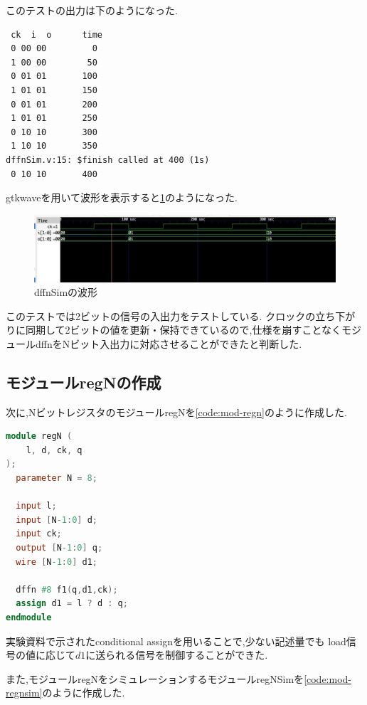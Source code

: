 \documentclass[autodetect-engine, dvi=dvipdfmx, 10pt, a4paper, ja=standard]{bxjsarticle}
\begin{document}
このテストの出力は下のようになった.

\begin{verbatim}
 ck  i  o      time
 0 00 00         0
 1 00 00        50
 0 01 01       100
 1 01 01       150
 0 01 01       200
 1 01 01       250
 0 10 10       300
 1 10 10       350
dffnSim.v:15: $finish called at 400 (1s)
 0 10 10       400
\end{verbatim}

gtkwaveを用いて波形を表示すると\ref{fig:ex6}のようになった.

\begin{figure}[H]
	\centering
	\includegraphics[width=\textwidth]{ex6-dffn.png}
	\caption{dffnSimの波形}
	\label{fig:ex6}
\end{figure}

このテストでは2ビットの信号の入出力をテストしている.
クロックの立ち下がりに同期して2ビットの値を更新・保持できているので,仕様を崩すことなくモジュールdffnをNビット入出力に対応させることができたと判断した.

\subsection{モジュールregNの作成}

次に,NビットレジスタのモジュールregNを\ref{code:mod-regn}のように作成した.

\begin{lstlisting}[language={Verilog}, caption={モジュールregNのVerilogコード}, label={code:mod-regn}]
module regN (
    l, d, ck, q
);
  parameter N = 8;

  input l;
  input [N-1:0] d;
  input ck;
  output [N-1:0] q;
  wire [N-1:0] d1;

  dffn #8 f1(q,d1,ck);
  assign d1 = l ? d : q;
endmodule
\end{lstlisting}

実験資料で示されたconditional assignを用いることで,少ない記述量でも
load信号の値に応じて$d1$に送られる信号を制御することができた.

また,モジュールregNをシミュレーションするモジュールregNSimを\ref{code:mod-regnsim}のように作成した.
\end{document}
